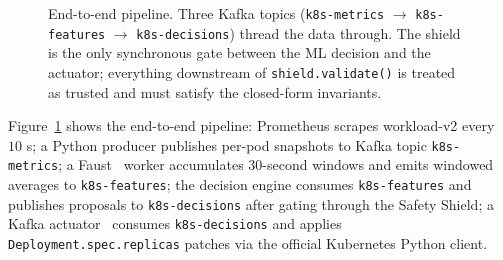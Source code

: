 \documentclass[conference,10pt]{IEEEtran}
\begin{document}
\begin{figure}[!t]
  \centering
  \caption{End-to-end pipeline. Three Kafka topics (\texttt{k8s-metrics} $\to$ \texttt{k8s-features} $\to$ \texttt{k8s-decisions}) thread the data through. The shield is the only synchronous gate between the ML decision and the actuator; everything downstream of \texttt{shield.validate()} is treated as trusted and must satisfy the closed-form invariants.}
  \label{fig:pipeline}
\end{figure}

Figure~\ref{fig:pipeline} shows the end-to-end pipeline: Prometheus
scrapes workload-v2 every $10$ s; a Python producer publishes per-pod
snapshots to Kafka topic \texttt{k8s-metrics}; a Faust~\cite{faust_doc}
worker accumulates $30$-second windows and emits windowed averages to
\texttt{k8s-features}; the decision engine consumes \texttt{k8s-features}
and publishes proposals to \texttt{k8s-decisions} after gating
through the Safety Shield; a Kafka actuator~\cite{kopf_doc} consumes
\texttt{k8s-decisions} and applies \texttt{Deployment.spec.replicas}
patches via the official Kubernetes Python client.
\end{document}
